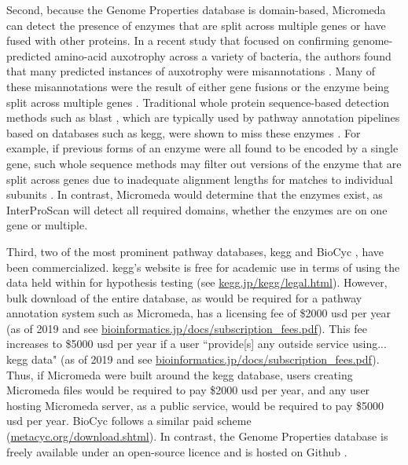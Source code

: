 Second, because the Genome Properties database is domain-based, Micromeda can detect the presence of enzymes that are split across multiple genes or have fused with other proteins. In a recent study that focused on confirming genome-predicted amino-acid auxotrophy across a variety of bacteria, the authors found that many predicted instances of auxotrophy were misannotations \cite{price2018filling}. Many of these misannotations were the result of either gene fusions or the enzyme being split across multiple genes \cite{price2018filling}. Traditional whole protein sequence-based detection methods such as \gls{blast} \cite{altschul1990basic}, which are typically used by pathway annotation pipelines based on databases such as \gls{kegg}, were shown to miss these enzymes \cite{price2018filling}. For example, if previous forms of an enzyme were all found to be encoded by a single gene, such whole sequence methods may filter out versions of the enzyme that are split across genes due to inadequate alignment lengths for matches to individual subunits \cite{price2018filling}. In contrast, Micromeda would determine that the enzymes exist, as InterProScan will detect all required domains, whether the enzymes are on one gene or multiple.

Third, two of the most prominent pathway databases, \gls{kegg} and BioCyc \cite{karp2005expansion}, have been commercialized. \gls{kegg}'s website is free for academic use in terms of using the data held within for hypothesis testing (see \href{www.kegg.jp/kegg/legal.html}{kegg.jp/kegg/legal.html}). However, bulk download of the entire database, as would be required for a pathway annotation system such as Micromeda, has a licensing fee of \$2000 \gls{usd} per year (as of 2019 and see \href{bioinformatics.jp/docs/subscription\_fees.pdf}{bioinformatics.jp/docs/subscription\_fees.pdf}). This fee increases to \$5000 \gls{usd} per year if a user ``provide[s] any outside service using... \gls{kegg} data" (as of 2019 and see \href{bioinformatics.jp/docs/subscription\_fees.pdf}{bioinformatics.jp/docs/subscription\_fees.pdf}). Thus, if Micromeda were built around the \gls{kegg} database, users creating Micromeda files would be required to pay \$2000 \gls{usd} per year, and any user hosting Micromeda server, as a public service, would be required to pay \$5000 \gls{usd} per year. BioCyc follows a similar paid scheme (\href{metacyc.org/download.shtml}{metacyc.org/download.shtml}). In contrast, the Genome Properties database is freely available under an open-source licence and is hosted on Github \cite{richardson2018genome}.

